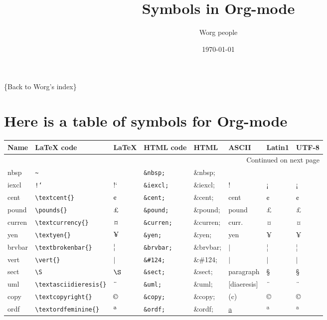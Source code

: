 \documentclass[11pt]{article}
\author{Worg people}
\date{\today}
\title{Symbols in Org-mode}
\begin{document}
\maketitle

\{Back to Worg's index\}


\section*{Here is a table of symbols for Org-mode}
\label{sec-1}

\begin{longtable}{llllllll}
Name & \LaTeX{} code & \LaTeX{} & HTML code & HTML & ASCII & Latin1 & UTF-8\\
\hline
\endhead
\hline\multicolumn{8}{r}{Continued on next page} \\
\endfoot
\endlastfoot
nbsp & \texttt{\textasciitilde{}} & $\mbox{~}$ & \texttt{\&nbsp;} & \&nbsp; &  &  & \\
iexcl & \texttt{!`} & $\mbox{!`}$ & \texttt{\&iexcl;} & \&iexcl; & ! & ¡ & ¡\\
cent & \texttt{\textbackslash{}textcent\{\}} & $\mbox{\textcent{}}$ & \texttt{\&cent;} & \&cent; & cent & ¢ & ¢\\
pound & \texttt{\textbackslash{}pounds\{\}} & $\mbox{\pounds{}}$ & \texttt{\&pound;} & \&pound; & pound & £ & £\\
curren & \texttt{\textbackslash{}textcurrency\{\}} & $\mbox{\textcurrency{}}$ & \texttt{\&curren;} & \&curren; & curr. & ¤ & ¤\\
yen & \texttt{\textbackslash{}textyen\{\}} & $\mbox{\textyen{}}$ & \texttt{\&yen;} & \&yen; & yen & ¥ & ¥\\
brvbar & \texttt{\textbackslash{}textbrokenbar\{\}} & $\mbox{\textbrokenbar{}}$ & \texttt{\&brvbar;} & \&brvbar; & $\vert{}$ & ¦ & ¦\\
vert & \texttt{\textbackslash{}vert\{\}} & $\vert{}$ & \texttt{\&\#124;} & \&\#124; & $\vert{}$ & $\vert{}$ & $\vert{}$\\
sect & \texttt{\textbackslash{}S} & $\mbox{\S}$ & \texttt{\&sect;} & \&sect; & paragraph & § & §\\
uml & \texttt{\textbackslash{}textasciidieresis\{\}} & $\mbox{\textasciidieresis{}}$ & \texttt{\&uml;} & \&uml; & [diaeresis] & ¨ & ¨\\
copy & \texttt{\textbackslash{}textcopyright\{\}} & $\mbox{\textcopyright{}}$ & \texttt{\&copy;} & \&copy; & (c) & © & ©\\
ordf & \texttt{\textbackslash{}textordfeminine\{\}} & $\mbox{\textordfeminine{}}$ & \texttt{\&ordf;} & \&ordf; & \uline{a} & ª & ª\\

\end{longtable}
\end{document}
